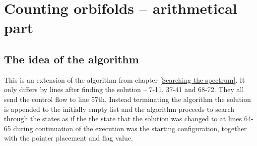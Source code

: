 \chapter{Counting orbifolds -- arithmetical part}\label{Counting orbifolds -- arithmetical part}





\section{The idea of the algorithm}
This is an extension of the algorithm from chapter \ref{Searching the spectrum}. It only differs by 
lines after finding the solution -- 7-11, 37-41 and 68-72. They all send the control flow 
to line 57th.
Instead terminating the algorithm the solution is appended to the 
initially empty list and the algorithm proceeds to search through the states as if the 
the state that the solution was changed to 
at lines 64-65 during continuation of the execution was  
the starting configuration, together with the pointer placement and flag value. 

